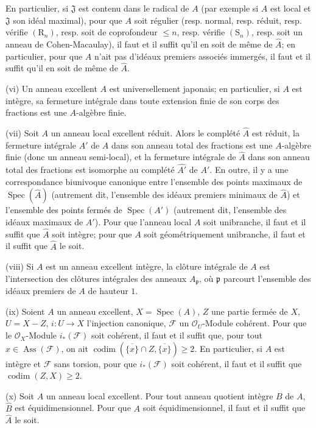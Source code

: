\begin{scholium}[7.8.3]
En particulier, si $\mathfrak J$ est contenu dans le radical de $A$ (par
exemple si $A$ est local et $\mathfrak J$ son idéal maximal), pour que $A$ soit
régulier (resp. normal, resp. réduit, resp. vérifie $(\mathrm R_n)$, resp. soit
de coprofondeur $\leq n$, resp. vérifie $(\mathrm S_n)$, resp. soit un anneau
de Cohen-Macaulay), il faut et il suffit qu'il en soit de même de $\widehat A$;
en particulier, pour que $A$ n'ait pas d'idéaux premiers associés immergés, il
faut et il suffit qu'il en soit de même de $\widehat A$.

(vi) Un anneau excellent $A$ est universellement japonais; en particulier, si
$A$ est intègre, sa fermeture intégrale dans toute extension finie de son corps
des fractions est une $A$-algèbre finie.

(vii) Soit $A$ un anneau local excellent réduit. Alors le complété $\widehat A$
est réduit, la fermeture intégrale $A'$ de $A$ dans son anneau total des
fractions est une $A$-algèbre finie (donc un anneau semi-local), et la fermeture
intégrale de $\widehat A$ dans son anneau total des fractions est isomorphe au
complété $\widehat {A'}$ de $A'$. En outre, il y a une correspondance biunivoque
canonique entre l'ensemble des points maximaux de
$\operatorname{Spec}(\widehat A)$ (autrement dit, l'ensemble des idéaux premiers
minimaux de $\widehat A$) et l'ensemble des points fermés de
$\operatorname{Spec}(A')$ (autrement dit, l'ensemble des idéaux maximaux de
$A'$). Pour que l'anneau local $A$ soit unibranche, il faut et il suffit que
$\widehat A$ soit intègre; pour que $A$ soit géométriquement unibranche, il faut
et il suffit que $\widehat A$ le soit.

(viii) Si $A$ est un anneau excellent intègre, la clôture intégrale de $A$ est
l'intersection des clôtures intégrales des anneaux $A_{\mathfrak p}$, où
$\mathfrak p$ parcourt l'ensemble des idéaux premiers de $A$ de hauteur $1$.

(ix) Soient $A$ un anneau excellent, $X=\operatorname{Spec}(A)$, $Z$ une partie
fermée de $X$, $U=X-Z$, $i:U\to X$ l'injection canonique, $\mathcal F$ un
$\mathcal O_U$-Module cohérent. Pour que le $\mathcal O_X$-Module
$i_*(\mathcal F)$ soit cohérent, il faut et il suffit que, pour tout
$x\in\operatorname{Ass}(\mathcal F)$, on ait
$\operatorname{codim}(\overline{\{x\}}\cap Z,\overline{\{x\}})\geq2$. En
particulier, si $A$ est intègre et $\mathcal F$ sans torsion, pour que
$i_*(\mathcal F)$ soit cohérent, il faut et il suffit que
$\operatorname{codim}(Z,X)\geq2$.


(x) Soit $A$ un anneau local excellent. Pour tout anneau quotient intègre $B$
de $A$, $\widehat B$ est équidimensionnel. Pour que $A$ soit équidimensionnel,
il faut et il suffit que $\widehat A$ le soit.
\end{scholium}

